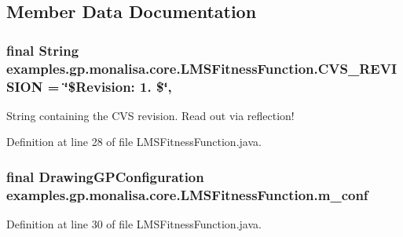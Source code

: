 \subsection{Member Data Documentation}
\hypertarget{classexamples_1_1gp_1_1monalisa_1_1core_1_1_l_m_s_fitness_function_ab167499a183c7c5c4ce987dcee96296c}{
\subsubsection[{C\-V\-S\-\_\-\-R\-E\-V\-I\-S\-I\-O\-N}]{\setlength{\rightskip}{0pt plus 5cm}final String examples.\-gp.\-monalisa.\-core.\-L\-M\-S\-Fitness\-Function.\-C\-V\-S\-\_\-\-R\-E\-V\-I\-S\-I\-O\-N = \char`\"{}\$Revision\-: 1. \$\char`\"{}\hspace{0.3cm}{\ttfamily [static]}, {\ttfamily [private]}}}\label{classexamples_1_1gp_1_1monalisa_1_1core_1_1_l_m_s_fitness_function_ab167499a183c7c5c4ce987dcee96296c}
String containing the C\-V\-S revision. Read out via reflection! 

Definition at line 28 of file L\-M\-S\-Fitness\-Function.\-java.

\hypertarget{classexamples_1_1gp_1_1monalisa_1_1core_1_1_l_m_s_fitness_function_a617f85f4c1c2c21e30ff2d2e06660d86}{
\subsubsection[{m\-\_\-conf}]{\setlength{\rightskip}{0pt plus 5cm}final {\bf Drawing\-G\-P\-Configuration} examples.\-gp.\-monalisa.\-core.\-L\-M\-S\-Fitness\-Function.\-m\-\_\-conf\hspace{0.3cm}{\ttfamily [private]}}}\label{classexamples_1_1gp_1_1monalisa_1_1core_1_1_l_m_s_fitness_function_a617f85f4c1c2c21e30ff2d2e06660d86}


Definition at line 30 of file L\-M\-S\-Fitness\-Function.\-java.

